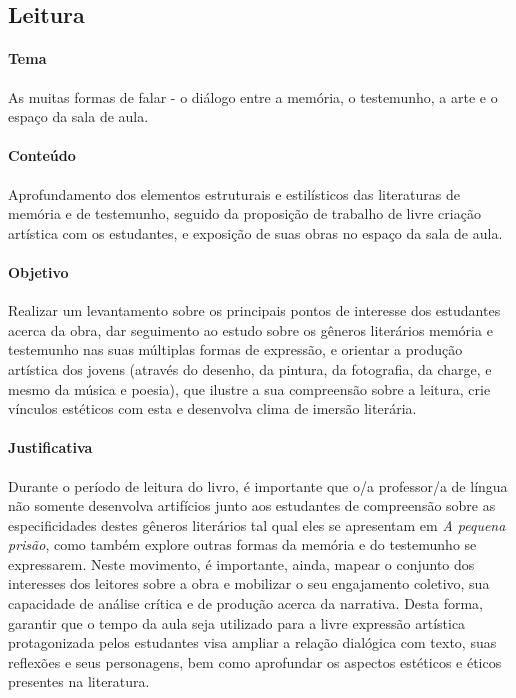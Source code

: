 \documentclass[11pt]{extarticle}
\begin{document}
\subsection{Leitura}

\paragraph{Tema} As muitas formas de falar - o diálogo entre a memória,
o testemunho, a arte e o espaço da sala de aula.

\paragraph{Conteúdo} Aprofundamento dos elementos estruturais e
estilísticos das literaturas de memória e de testemunho, seguido da
proposição de trabalho de livre criação artística com os estudantes, e
exposição de suas obras no espaço da sala de aula.

\paragraph{Objetivo} Realizar um levantamento sobre os principais pontos
de interesse dos estudantes acerca da obra, dar seguimento ao estudo
sobre os gêneros literários memória e testemunho nas suas múltiplas
formas de expressão, e orientar a produção artística dos jovens (através
do desenho, da pintura, da fotografia, da charge, e mesmo da música e
poesia), que ilustre a sua compreensão sobre a leitura, crie vínculos
estéticos com esta e desenvolva clima de imersão literária.

\paragraph{Justificativa} Durante o período de leitura do livro, é
importante que o/a professor/a de língua não somente desenvolva
artifícios junto aos estudantes de compreensão sobre as especificidades
destes gêneros literários tal qual eles se apresentam em \emph{A pequena
prisão}, como também explore outras formas da memória e do testemunho se
expressarem. Neste movimento, é importante, ainda, mapear o conjunto dos
interesses dos leitores sobre a obra e mobilizar o seu engajamento
coletivo, sua capacidade de análise crítica e de produção acerca da
narrativa. Desta forma, garantir que o tempo da aula seja utilizado para
a livre expressão artística protagonizada pelos estudantes visa ampliar
a relação dialógica com texto, suas reflexões e seus personagens, bem
como aprofundar os aspectos estéticos e éticos presentes na literatura.
\end{document}

